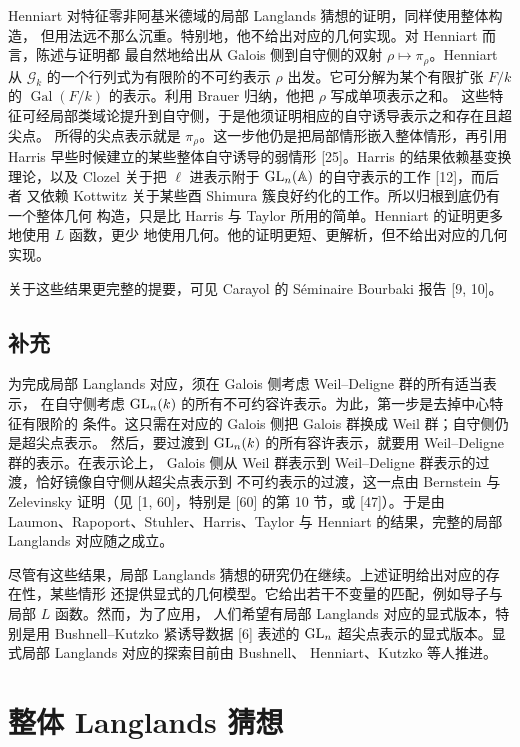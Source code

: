Henniart 对特征零非阿基米德域的局部 Langlands 猜想的证明，同样使用整体构造，
但用法远不那么沉重。特别地，他不给出对应的几何实现。对 Henniart 而言，陈述与证明都
最自然地给出从 Galois 侧到自守侧的双射 $\rho\mapsto\pi_\rho$。Henniart 从 $\mathcal{G}_k$
的一个行列式为有限阶的不可约表示 $\rho$ 出发。它可分解为某个有限扩张 $F/k$ 的
$\operatorname{Gal}(F/k)$ 的表示。利用 Brauer 归纳，他把 $\rho$ 写成单项表示之和。
这些特征可经局部类域论提升到自守侧，于是他须证明相应的自守诱导表示之和存在且超尖点。
所得的尖点表示就是 $\pi_\rho$。这一步他仍是把局部情形嵌入整体情形，再引用 Harris
早些时候建立的某些整体自守诱导的弱情形 [25]。Harris 的结果依赖基变换理论，以及
Clozel 关于把 $\ell$ 进表示附于 $\mathrm{GL}_n(\mathbb{A})$ 的自守表示的工作 [12]，而后者
又依赖 Kottwitz 关于某些酉 Shimura 簇良好约化的工作。所以归根到底仍有一个整体几何
构造，只是比 Harris 与 Taylor 所用的简单。Henniart 的证明更多地使用 $L$ 函数，更少
地使用几何。他的证明更短、更解析，但不给出对应的几何实现。

关于这些结果更完整的提要，可见 Carayol 的 Séminaire Bourbaki 报告 [9, 10]。

\subsection{补充}

为完成局部 Langlands 对应，须在 Galois 侧考虑 Weil--Deligne 群的所有适当表示，
在自守侧考虑 $\mathrm{GL}_n(k)$ 的所有不可约容许表示。为此，第一步是去掉中心特征有限阶的
条件。这只需在对应的 Galois 侧把 Galois 群换成 Weil 群；自守侧仍是超尖点表示。
然后，要过渡到 $\mathrm{GL}_n(k)$ 的所有容许表示，就要用 Weil--Deligne 群的表示。在表示论上，
Galois 侧从 Weil 群表示到 Weil--Deligne 群表示的过渡，恰好镜像自守侧从超尖点表示到
不可约表示的过渡，这一点由 Bernstein 与 Zelevinsky 证明（见 [1, 60]，特别是 [60]
的第 10 节，或 [47]）。于是由 Laumon、Rapoport、Stuhler、Harris、Taylor 与 Henniart
的结果，完整的局部 Langlands 对应随之成立。

尽管有这些结果，局部 Langlands 猜想的研究仍在继续。上述证明给出对应的存在性，某些情形
还提供显式的几何模型。它给出若干不变量的匹配，例如导子与局部 $L$ 函数。然而，为了应用，
人们希望有局部 Langlands 对应的显式版本，特别是用 Bushnell--Kutzko 紧诱导数据 [6]
表述的 $\mathrm{GL}_n$ 超尖点表示的显式版本。显式局部 Langlands 对应的探索目前由 Bushnell、
Henniart、Kutzko 等人推进。

\section{整体 Langlands 猜想}

